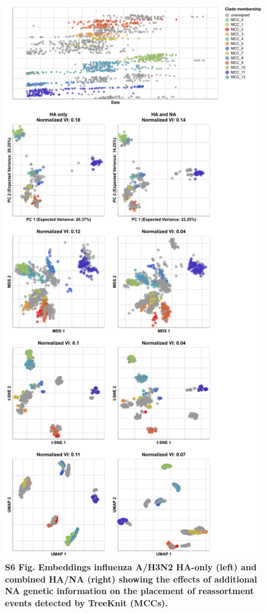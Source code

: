 \documentclass[10pt,letterpaper]{article}
\begin{document}
\begin{figure}[!h]
\includegraphics[width=\columnwidth]{figures/flu-2016-2018-ha-na-all-embeddings-by-mcc.png}
\caption*{{\bf S6 Fig. Embeddings influenza A/H3N2 HA-only (left) and combined HA/NA (right) showing the effects of additional NA genetic information on the placement of reassortment events detected by TreeKnit (MCCs).}}
\end{figure}
\end{document}

